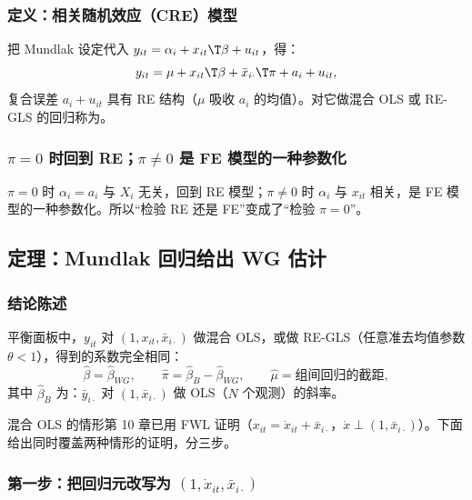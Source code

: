 \subsubsection{定义：相关随机效应（CRE）模型}

\begin{defn}[相关随机效应模型]\label{def:U11b-cre}
把 Mundlak 设定代入 $y_{it}=\alpha_i+x_{it}\T\beta+u_{it}$，得：
\[
y_{it}=\mu+x_{it}\T\beta+\bar x_{i\cdot}\T\pi+a_i+u_{it},
\]
复合误差 $a_i+u_{it}$ 具有 RE 结构（$\mu$ 吸收 $a_i$ 的均值）。对它做混合 OLS 或 RE-GLS 的回归称为。
\end{defn}

\subsubsection{\texorpdfstring{$\pi=0$}{pi = 0} 时回到 RE；\texorpdfstring{$\pi\neq0$}{pi != 0} 是 FE 模型的一种参数化}

$\pi=0$ 时 $\alpha_i=a_i$ 与 $X_i$ 无关，回到 RE 模型；$\pi\neq0$ 时 $\alpha_i$ 与 $x_{it}$ 相关，是 FE 模型的一种参数化。所以“检验 RE 还是 FE”变成了“检验 $\pi=0$”。

\subsection{定理：Mundlak 回归给出 WG 估计}

\subsubsection{结论陈述}

\begin{thm}[Mundlak (1978)]\label{thm:U11b-mundlak}
平衡面板中，$y_{it}$ 对 $(1,x_{it},\bar x_{i\cdot})$ 做混合 OLS，或做 RE-GLS（任意准去均值参数 $\theta<1$），得到的系数完全相同：
\[
\hat\beta=\hat\beta_{WG},\qquad \hat\pi=\hat\beta_B-\hat\beta_{WG},\qquad \hat\mu=\text{组间回归的截距},
\]
其中 $\hat\beta_B$ 为：$\bar y_{i\cdot}$ 对 $(1,\bar x_{i\cdot})$ 做 OLS（$N$ 个观测）的斜率。
\end{thm}
混合 OLS 的情形第 10 章已用 FWL 证明（$x_{it}=\dot x_{it}+\bar x_{i\cdot}$，$\dot x\perp(1,\bar x_{i\cdot})$）。下面给出同时覆盖两种情形的证明，分三步。

\subsubsection{第一步：把回归元改写为 \texorpdfstring{$(1,\dot x_{it},\bar x_{i\cdot})$}{(1, x-dot, x-bar)}}

